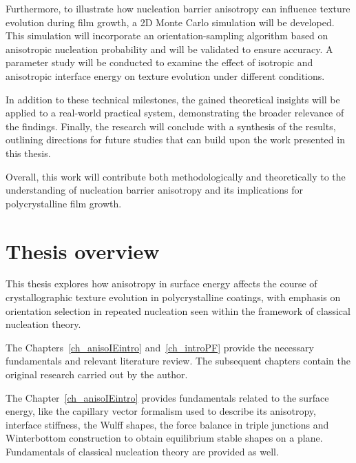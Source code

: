 Furthermore, to illustrate how nucleation barrier anisotropy can influence texture evolution during film growth, a 2D Monte Carlo simulation will be developed. This simulation will incorporate an orientation-sampling algorithm based on anisotropic nucleation probability and will be validated to ensure accuracy. A parameter study will be conducted to examine the effect of isotropic and anisotropic interface energy on texture evolution under different conditions.

In addition to these technical milestones, the gained theoretical insights will be applied to a real-world practical system, demonstrating the broader relevance of the findings. Finally, the research will conclude with a synthesis of the results, outlining directions for future studies that can build upon the work presented in this thesis.

Overall, this work will contribute both methodologically and theoretically to the understanding of nucleation barrier anisotropy and its implications for polycrystalline film growth. 


\section{Thesis overview} \label{sec_Thesis_overview}
This thesis explores how anisotropy in surface energy affects the course of crystallographic texture evolution in polycrystalline coatings, with emphasis on orientation selection in repeated nucleation seen within the framework of classical nucleation theory. 


The Chapters~\ref{ch_anisoIEintro} and~\ref{ch_introPF} provide the necessary fundamentals and relevant literature review. The subsequent chapters contain the original research carried out by the author.


The Chapter~\ref{ch_anisoIEintro} provides fundamentals related to the surface energy, like the capillary vector formalism used to describe its anisotropy, interface stiffness, the Wulff shapes, the force balance in triple junctions and Winterbottom construction to obtain equilibrium stable shapes on a plane. Fundamentals of classical nucleation theory are provided as well.

